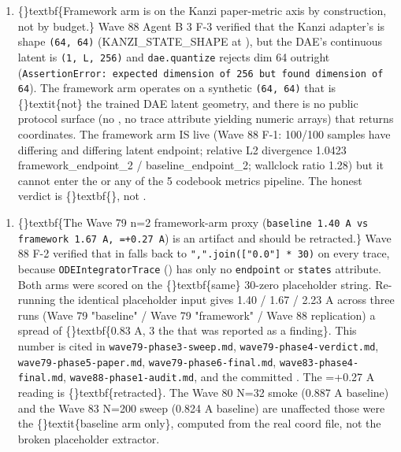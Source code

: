 \documentclass{article}
\begin{document}
\begin{enumerate}
\item \{\}textbf\{Framework arm is  on the Kanzi paper-metric axis  by construction, not by budget.\} Wave 88 Agent B 3 F-3 verified that the Kanzi adapter's  is shape \texttt{(64, 64)} (KANZI\_STATE\_SHAPE at ), but the DAE's continuous latent is \texttt{(1, L, 256)} and \texttt{dae.quantize} rejects dim 64 outright (\texttt{AssertionError: expected dimension of 256 but found dimension of 64}). The framework arm operates on a synthetic \texttt{(64, 64)}  that is \{\}textit\{not\} the trained DAE latent geometry, and there is no public protocol surface (no , no trace attribute yielding numeric arrays) that returns coordinates. The framework arm IS live (Wave 88 F-1: 100/100 samples have differing  and differing latent endpoint; relative L2 divergence 1.0423  framework\_endpoint\_2 / baseline\_endpoint\_2; wallclock ratio 1.28) but it cannot enter the  or any of the 5 codebook metrics pipeline. The honest verdict is \{\}textbf\{\}, not .
\end{enumerate}
\begin{enumerate}
\item \sloppy \{\}textbf\{The Wave 79 n=2 framework-arm proxy (\texttt{baseline 1.40 A vs framework 1.67 A, =+0.27 A}) is an artifact and should be retracted.\} Wave 88 F-2 verified that  in  falls back to \texttt{",".join(["0.0"] * 30)} on every trace, because \texttt{ODEIntegratorTrace} () has only   no \texttt{endpoint} or \texttt{states} attribute. Both arms were scored on the \{\}textbf\{same\} 30-zero placeholder string. Re-running the identical placeholder input gives 1.40 / 1.67 / 2.23 A across three runs (Wave 79 "baseline" / Wave 79 "framework" / Wave 88 replication)  a spread of \{\}textbf\{0.83 A, 3 the  that was reported as a finding\}. This number is cited in \texttt{wave79-phase3-sweep.md}, \texttt{wave79-phase4-verdict.md}, \texttt{wave79-phase5-paper.md}, \texttt{wave79-phase6-final.md}, \texttt{wave83-phase4-final.md}, \texttt{wave88-phase1-audit.md}, and the committed . The =+0.27 A reading is \{\}textbf\{retracted\}. The Wave 80 N=32 smoke (0.887 A baseline) and the Wave 83 N=200 sweep (0.824 A baseline) are unaffected  those were the \{\}textit\{baseline arm only\}, computed from the real  coord file, not the broken placeholder extractor.
\end{enumerate}
\end{document}

